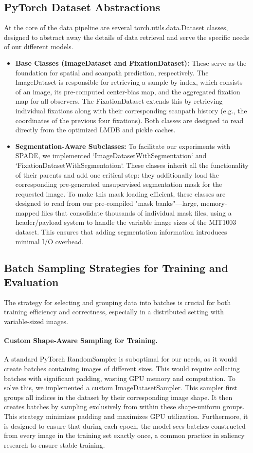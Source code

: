 \subsection{PyTorch Dataset Abstractions}
\label{sec:impl_dataset_classes}
At the core of the data pipeline are several torch.utils.data.Dataset classes, designed to abstract away the details of data retrieval and serve the specific needs of our different models.
\begin{itemize}
\item \textbf{Base Classes (ImageDataset and FixationDataset):} These serve as the foundation for spatial and scanpath prediction, respectively. The ImageDataset is responsible for retrieving a sample by index, which consists of an image, its pre-computed center-bias map, and the aggregated fixation map for all observers. The FixationDataset extends this by retrieving individual fixations along with their corresponding scanpath history (e.g., the coordinates of the previous four fixations). Both classes are designed to read directly from the optimized LMDB and pickle caches.
\item \textbf{Segmentation-Aware Subclasses:} To facilitate our experiments with SPADE, we implemented `ImageDatasetWithSegmentation` and `FixationDatasetWithSegmentation`. These classes inherit all the functionality of their parents and add one critical step: they additionally load the corresponding pre-generated unsupervised segmentation mask for the requested image. To make this mask loading efficient, these classes are designed to read from our pre-compiled "mask banks"---large, memory-mapped files that consolidate thousands of individual mask files, using a header/payload system to handle the variable image sizes of the MIT1003 dataset. This ensures that adding segmentation information introduces minimal I/O overhead.
\end{itemize}
\subsection{Batch Sampling Strategies for Training and Evaluation}
\label{sec:impl_sampling}
The strategy for selecting and grouping data into batches is crucial for both training efficiency and correctness, especially in a distributed setting with variable-sized images.
\paragraph{Custom Shape-Aware Sampling for Training.}
A standard PyTorch RandomSampler is suboptimal for our needs, as it would create batches containing images of different sizes. This would require collating batches with significant padding, wasting GPU memory and computation. To solve this, we implemented a custom ImageDatasetSampler. This sampler first groups all indices in the dataset by their corresponding image shape. It then creates batches by sampling exclusively from within these shape-uniform groups. This strategy minimizes padding and maximizes GPU utilization. Furthermore, it is designed to ensure that during each epoch, the model sees batches constructed from every image in the training set exactly once, a common practice in saliency research to ensure stable training.
